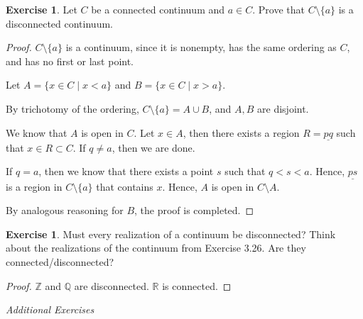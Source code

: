 \documentclass[11pt]{article}
\newcommand{\bbQ}{\mathbb{Q}}
\newcommand{\bbR}{\mathbb{R}}
\newcommand{\bbZ}{\mathbb{Z}}
\renewcommand{\_}[1]{\underline{ #1 }}
\theoremstyle{definition}
\newtheorem{exercise}[theorem]{Exercise}
\numberwithin{equation}{subsection}
\begin{document}
\begin{exercise} Let $C$ be a connected continuum and $a\in C.$ Prove that $C\setminus\{a\}$ is a disconnected continuum.
\begin{proof}

$C\setminus\{a\}$ is a continuum, since it is nonempty, has the same ordering as $C$, and has no first or last point.

Let $A = \{x \in C \mid x<a\}$ and $B=\{x \in C \mid x>a\}$.

By trichotomy of the ordering, $C\setminus\{a\} = A \cup B$, and $A, B$ are disjoint.

We know that $A$ is open in $C$. Let $x 
\in A$, then there exists a region $R = \_{pq}$ such that $x \in R \subset C$. If $q \neq a$, then we are done.

If $q = a$, then we know that there exists a point $s$ such that $q<s<a$. Hence, $\_{ps}$ is a region in $C \setminus \{a\}$ that contains $x$. Hence, $A$ is open in $C \setminus A$.

By analogous reasoning for $B$, the proof is completed.


\renewcommand\qedsymbol{QED}
\end{proof}
\end{exercise} 




\begin{exercise} Must every realization of a continuum be disconnected?
Think about the realizations of the continuum from Exercise 3.26. Are they connected/disconnected? 
\begin{proof}
$\bbZ$ and $\bbQ$ are disconnected. $\bbR$ is connected.

\renewcommand\qedsymbol{QED}
\end{proof}
\end{exercise} 
\bigskip

\begin{center}
{\em Additional Exercises}
\end{center}
\end{document}
